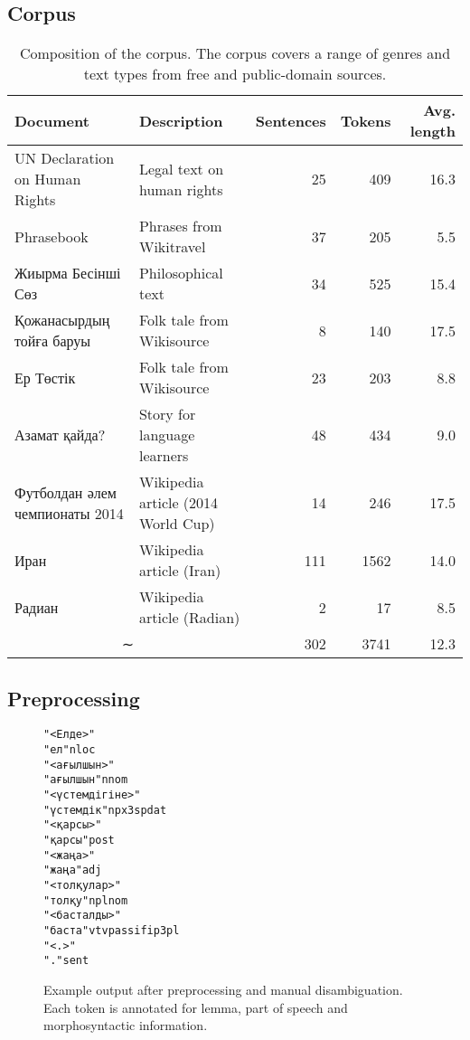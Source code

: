 \documentclass[a4paper,11pt, onecolumn,twoside]{article}
\newcommand{\tilda}{{\fsfont ∼}}
\begin{document}
\subsection{Corpus}

\begin{table}[htbp]
  \centering
  \caption{Composition of the corpus. The corpus covers a range of genres and text types from free and public-domain sources.}
	\begin{small}
		\begin{tabular}{llrrr}
			\toprule
				\textbf{Document} & \textbf{Description} & \textbf{Sentences} & \textbf{Tokens} & \textbf{Avg. length}\\
			\midrule
				UN Declaration on Human Rights & Legal text on human rights & 25 & 409 & 16.3 \\
				Phrasebook                     & Phrases from Wikitravel   & 37 & 205 & 5.5 \\
				Жиырма Бесінші Сөз             & Philosophical text        & 34 & 525 & 15.4 \\ 
				Қожанасырдың тойға баруы       & Folk tale from Wikisource  & 8 & 140 & 17.5 \\
				Ер Төстік                      & Folk tale from Wikisource  & 23 & 203 & 8.8 \\
				Азамат қайда?                  & Story for language learners & 48 & 434 & 9.0 \\
				Футболдан әлем чемпионаты 2014 & Wikipedia article (2014 World Cup) & 14 & 246 & 17.5 \\
				Иран & Wikipedia article (Iran)                                & 111 & 1562 & 14.0 \\
				Радиан & Wikipedia article (Radian)                            & 2 & 17 & 8.5 \\
			\midrule
			\multicolumn{2}{c}{\tilda{}} & 302 & 3741 & 12.3 \\\cmidrule[\heavyrulewidth]{3-5}
		\end{tabular}
	\end{small}
\end{table}


\subsection{Preprocessing}

\begin{figure}
\begin{tiny}
\begin{alltt}
"<Елде>"
        "ел" n loc
"<ағылшын>"
        "ағылшын" n nom
"<үстемдігіне>"
        "үстемдік" n px3sp dat
"<қарсы>"
        "қарсы" post
"<жаңа>"
        "жаңа" adj
"<толқулар>"
        "толқу" n pl nom
"<басталды>"
        "баста" v tv pass ifi p3 pl
"<.>"
        "." sent
\end{alltt}
\end{tiny}
\caption{Example output after preprocessing and manual disambiguation. Each token is annotated for lemma,
   part of speech and morphosyntactic information.}
\end{figure}
\end{document}

